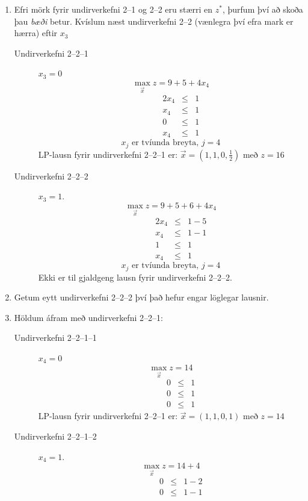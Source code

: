 \begin{lausnSYND}
\begin{enumerate}
\item\label{skodabadargreinar} Efri mörk fyrir undirverkefni 2--1 og 2--2 eru stærri en $z^*$, þurfum því að skoða þau \emph{bæði} betur. Kvíslum næst undirverkefni 2--2 (vænlegra því efra mark er hærra) eftir $x_3$
\begin{description}
\item[Undirverkefni 2--2--1] $x_3 = 0$ 
$$ \max_{\vec{x}} z = 9+ 5+ 4 x_4$$
\[\begin{array}{rrrrcl}
      & & &   2x_4 & \le & 1 \\
      & & &   x_4 & \le & 1 \\
      & & & 0      & \le & 1 \\
      & & &   x_4 & \le & 1
\end{array}\]
$$ x_j \mbox{ er tvíunda breyta, $j=4$}$$
LP-lausn fyrir undirverkefni 2--2--1 er: $\vec{x}=(1,1,0,\frac{1}{2})$ með $z=16$
\item[Undirverkefni 2--2--2] $x_3 = 1$.
$$ \max_{\vec{x}} z = 9+ 5+ 6 + 4 x_4$$
\[\begin{array}{rrrrcl}
      & & &2 x_4 & \le & 1-5 \\
      & &   & x_4 & \le & 1-1 \\
      & & & 1     & \le & 1\\
      & &        &   x_4 & \le & 1
\end{array}\]
$$ x_j \mbox{ er tvíunda breyta, $j=4$}$$
Ekki er til gjaldgeng lausn fyrir undirverkefni 2--2--2.
\end{description}
  \item Getum eytt undirverkefni 2--2--2 því það hefur engar löglegar lausnir. 
  \item Höldum áfram með undirverkefni 2--2--1:
    \begin{description}
    \item[Undirverkefni 2--2--1--1] $x_4 = 0$ 
$$ \max_{\vec{x}} z = 14$$
\[\begin{array}{rrrrcl}
      & & &   0 & \le & 1 \\
      & & &   0 & \le & 1 \\
      & & &   0 & \le & 1
\end{array}\]
LP-lausn fyrir undirverkefni 2--2--1 er: $\vec{x}=(1,1,0,1)$ með $z=14$
\item[Undirverkefni 2--2--1--2] $x_4 = 1$.
$$ \max_{\vec{x}} z = 14+ 4$$
\[\begin{array}{rrrrcl}
      & & &   0 & \le & 1-2 \\
      & & &   0 & \le & 1-1 \\
      

\end{array}\]
\end{description}
\end{enumerate}
\end{lausnSYND}
